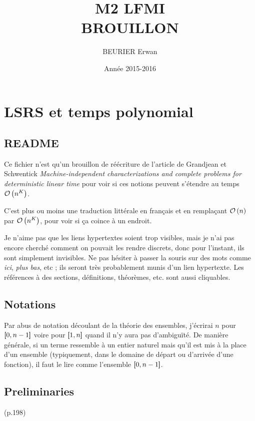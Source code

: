 \documentclass{report}
\author{BEURIER Erwan}
\title{M2 LFMI \\ BROUILLON }
\date{Année 2015-2016}
\begin{document}
	
	\maketitle
	
	\tableofcontents
	
	\pagebreak 
	
	\chapter{LSRS et temps polynomial}
	\label{chap:LSRS}
	
	\section*{README}
		\label{sec:README}
	
	Ce fichier n'est qu'un brouillon de réécriture de l'article de Grandjean et Schwentick \emph{Machine-independent characterizations and complete problems for deterministic linear time} pour voir si ces notions peuvent s'étendre au temps $\mathcal{O}\left( n^K \right)$.
	
	C'est plus ou moins une traduction littérale en français et en remplaçant $\mathcal{O}\left( n \right)$ par $\mathcal{O}\left( n^K \right)$, pour voir si ça coince à un endroit.
	
	Je n'aime pas que les liens hypertextes soient trop visibles, mais je n'ai pas encore cherché comment on pouvait les rendre discrets, donc pour l'instant, ils sont simplement invisibles. Ne pas hésiter à passer la souris sur des mots comme \emph{ici}, \emph{plus bas}, etc ; ils seront très probablement munis d'un lien hypertexte. Les références à des sections, définitions, théorèmes, etc. sont aussi cliquables.
	
	
	\section*{Notations}
		\label{sec:Notations}
	
	
	Par abus de notation découlant de la théorie des ensembles, j'écrirai $n$ pour $\left[\!\!\>\!\left[ 0 , n-1 \right]\!\!\>\!\right]$ voire pour $\left[\!\!\>\!\left[ 1 , n \right]\!\!\>\!\right]$ quand il n'y aura pas d'ambiguïté. De manière générale, si un terme ressemble à un entier naturel mais qu'il est mis à la place d'un ensemble (typiquement, dans le domaine de départ ou d'arrivée d'une fonction), il faut le lire comme l'ensemble $\left[\!\!\>\!\left[ 0 , n-1 \right]\!\!\>\!\right]$.
	
	\pagebreak
	
	\section{Preliminaries} (p.198)
		\label{sec:Preliminaries}
	
\end{document}
